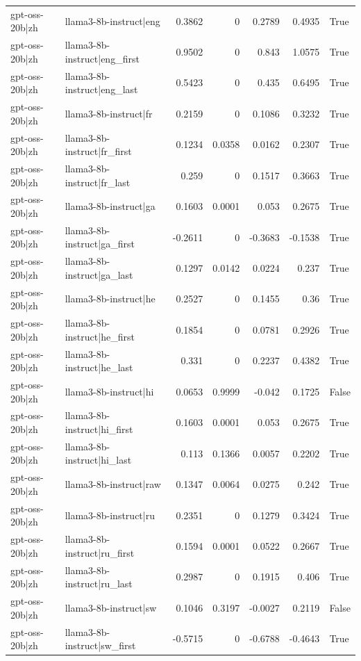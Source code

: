 \begin{table}
\begin{tabular}{l l r r r r l}
gpt-oss-20b|zh & llama3-8b-instruct|eng & 0.3862 & 0 & 0.2789 & 0.4935 & True \\
gpt-oss-20b|zh & llama3-8b-instruct|eng_first & 0.9502 & 0 & 0.843 & 1.0575 & True \\
gpt-oss-20b|zh & llama3-8b-instruct|eng_last & 0.5423 & 0 & 0.435 & 0.6495 & True \\
gpt-oss-20b|zh & llama3-8b-instruct|fr & 0.2159 & 0 & 0.1086 & 0.3232 & True \\
gpt-oss-20b|zh & llama3-8b-instruct|fr_first & 0.1234 & 0.0358 & 0.0162 & 0.2307 & True \\
gpt-oss-20b|zh & llama3-8b-instruct|fr_last & 0.259 & 0 & 0.1517 & 0.3663 & True \\
gpt-oss-20b|zh & llama3-8b-instruct|ga & 0.1603 & 0.0001 & 0.053 & 0.2675 & True \\
gpt-oss-20b|zh & llama3-8b-instruct|ga_first & -0.2611 & 0 & -0.3683 & -0.1538 & True \\
gpt-oss-20b|zh & llama3-8b-instruct|ga_last & 0.1297 & 0.0142 & 0.0224 & 0.237 & True \\
gpt-oss-20b|zh & llama3-8b-instruct|he & 0.2527 & 0 & 0.1455 & 0.36 & True \\
gpt-oss-20b|zh & llama3-8b-instruct|he_first & 0.1854 & 0 & 0.0781 & 0.2926 & True \\
gpt-oss-20b|zh & llama3-8b-instruct|he_last & 0.331 & 0 & 0.2237 & 0.4382 & True \\
gpt-oss-20b|zh & llama3-8b-instruct|hi & 0.0653 & 0.9999 & -0.042 & 0.1725 & False \\
gpt-oss-20b|zh & llama3-8b-instruct|hi_first & 0.1603 & 0.0001 & 0.053 & 0.2675 & True \\
gpt-oss-20b|zh & llama3-8b-instruct|hi_last & 0.113 & 0.1366 & 0.0057 & 0.2202 & True \\
gpt-oss-20b|zh & llama3-8b-instruct|raw & 0.1347 & 0.0064 & 0.0275 & 0.242 & True \\
gpt-oss-20b|zh & llama3-8b-instruct|ru & 0.2351 & 0 & 0.1279 & 0.3424 & True \\
gpt-oss-20b|zh & llama3-8b-instruct|ru_first & 0.1594 & 0.0001 & 0.0522 & 0.2667 & True \\
gpt-oss-20b|zh & llama3-8b-instruct|ru_last & 0.2987 & 0 & 0.1915 & 0.406 & True \\
gpt-oss-20b|zh & llama3-8b-instruct|sw & 0.1046 & 0.3197 & -0.0027 & 0.2119 & False \\
gpt-oss-20b|zh & llama3-8b-instruct|sw_first & -0.5715 & 0 & -0.6788 & -0.4643 & True \\

\end{tabular}
\end{table}
